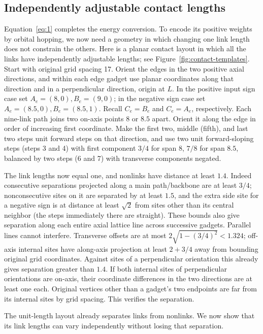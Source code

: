 \subsection{Independently adjustable contact lengths}

Equation~\eqref{eq:1} completes the energy conversion. To encode its
positive weights by orbital hopping, we now need a geometry in which
changing one link length does not constrain the others.
Here is a planar contact layout in which all the links have independently adjustable lengths; see Figure~\ref{fig:contact-templates}. Start with original grid spacing 17. Orient the edges in the two positive axial directions, and within each edge gadget use planar coordinates along that direction and in a perpendicular direction, origin at \(L\). In the positive input sign case set \(A_e=(8,0), B_e=(9,0)\); in the negative sign case set \(A_e=(8.5,0), B_e=(8.5,1)\). Recall \(C_e=B_e\) and \(C_e=A_e\), respectively. Each nine-link path joins two on-axis points \(8\) or \(8.5\) apart. Orient it along the edge in order of increasing first coordinate. Make the first two, middle (fifth), and last two steps unit forward steps on that direction, and use two unit forward-sloping steps (steps 3 and 4) with first component \(3/4\) for span \(8\), \(7/8\) for span \(8.5\), balanced by two steps (6 and 7) with transverse components negated.

The link lengths now equal one, and nonlinks have distance at least \(1.4\). Indeed consecutive separations projected along a main path/backbone are at least \(3/4\); nonconsecutive sites on it are separated by at least \(1.5\), and the extra side site for a negative sign is at distance at least \(\sqrt2\) from sites other than its central neighbor (the steps immediately there are straight). These bounds also give separation along each entire axial lattice line across successive gadgets. Parallel lines cannot interfere. Transverse offsets are at most \(2\sqrt{1-(3/4)^2}<1.324\); off-axis internal sites have along-axis projection at least \(2+3/4\) away from bounding original grid coordinates. Against sites of a perpendicular orientation this already gives separation greater than \(1.4\). If both internal sites of perpendicular orientations are on-axis, their coordinate differences in the two directions are at least one each. Original vertices other than a gadget's two endpoints are far from its internal sites by grid spacing. This verifies the separation.

The unit-length layout already separates links from nonlinks. We now
show that its link lengths can vary independently without losing that
separation.

